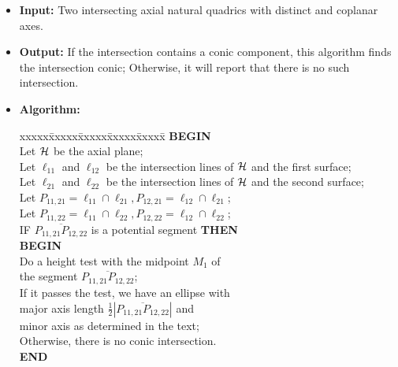 \begin{table}
\label{table1}
\begin{minipage}{5in}
{\small
\begin{itemize}
     \item {\bf Input:} Two intersecting axial natural quadrics with 
          distinct and coplanar axes.
     \item {\bf Output:} If the intersection contains a conic component, this
          algorithm finds the intersection conic; Otherwise, it will report
          that there is no such intersection.
     \item {\bf Algorithm:}
     \begin{tabbing}
          xxxxx\=xxxxx\=xxxxx\=xxxxx\=xxxxx\=\kill
          \> {\bf BEGIN} \\
          \>\>  Let ${\cal H}$ be the axial plane; \\
          \>\>  Let $\ell_{11}$ and $\ell_{12}$ be the intersection lines
                    of ${\cal H}$ and the first surface; \\
          \>\>  Let $\ell_{21}$ and $\ell_{22}$ be the intersection lines
                    of ${\cal H}$ and the second surface; \\
          \>\>  Let $P_{11,21}=\ell_{11}\cap \ell_{21}, 
                     P_{12,21}=\ell_{12}\cap \ell_{21}$; \\
          \>\>  Let $P_{11,22}=\ell_{11}\cap \ell_{22}, 
                     P_{12,22}=\ell_{12}\cap \ell_{22}$; \\
          \>\>  IF $\overline{P_{11,21}P_{12,22}}$ is a potential segment 
                    {\bf THEN} \\
          \>\>\>    {\bf BEGIN} \\
          \>\>\>\>      Do a height test with the midpoint $M_1$ of \\
          \>\>\>\>\>         the segment $\overline{P_{11,21}P_{12,22}}$; \\
          \>\>\>\>      If it passes the test, we have an ellipse with \\
          \>\>\>\>\>         major axis length
                             $\frac{1}{2}|\overline{P_{11,21}P_{12,22}}|$ and\\
          \>\>\>\>\>         minor axis as determined in the text; \\
          \>\>\>\>      Otherwise, there is no conic intersection. \\
          \>\>\>    {\bf END} \\

\end{tabbing}
\end{itemize}}
\end{minipage}
\end{table}
